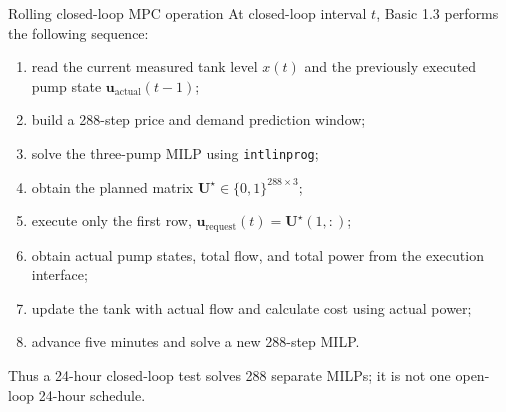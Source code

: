 \documentclass[t,12pt]{beamer}
\newcommand{\code}[1]{\texttt{#1}}
\begin{document}
\begin{frame}{Rolling closed-loop MPC operation}
At closed-loop interval $t$, Basic 1.3 performs the following sequence:
\begin{enumerate}
  \item read the current measured tank level $x(t)$ and the previously
        executed pump state $\bm u_{\mathrm{actual}}(t-1)$;
  \item build a 288-step price and demand prediction window;
  \item solve the three-pump MILP using \code{intlinprog};
  \item obtain the planned matrix
        $\bm U^\star\in\{0,1\}^{288\times3}$;
  \item execute only the first row,
        $\bm u_{\mathrm{request}}(t)=\bm U^\star(1,:)$;
  \item obtain actual pump states, total flow, and total power from the
        execution interface;
  \item update the tank with actual flow and calculate cost using actual
        power;
  \item advance five minutes and solve a new 288-step MILP.
\end{enumerate}

Thus a 24-hour closed-loop test solves 288 separate MILPs; it is not one
open-loop 24-hour schedule.
\end{frame}
\end{document}
